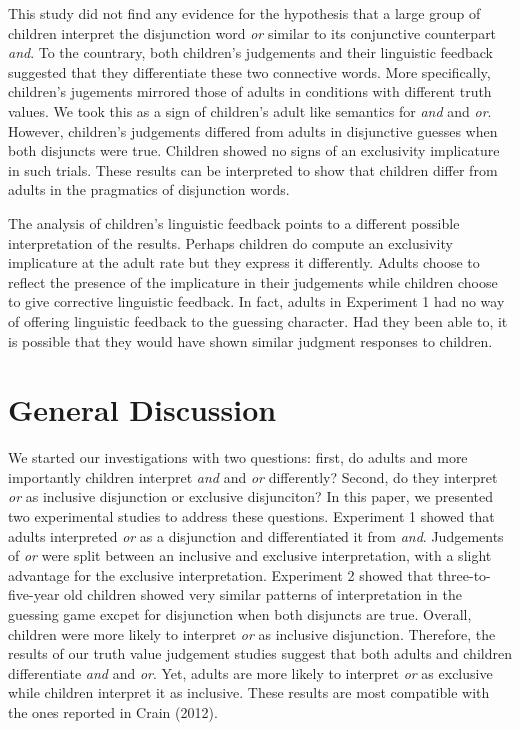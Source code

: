\documentclass[10pt, letterpaper]{article}
\begin{document}
This study did not find any evidence for the hypothesis that a large
group of children interpret the disjunction word \emph{or} similar to
its conjunctive counterpart \emph{and}. To the countrary, both
children's judgements and their linguistic feedback suggested that they
differentiate these two connective words. More specifically, children's
jugements mirrored those of adults in conditions with different truth
values. We took this as a sign of children's adult like semantics for
\emph{and} and \emph{or}. However, children's judgements differed from
adults in disjunctive guesses when both disjuncts were true. Children
showed no signs of an exclusivity implicature in such trials. These
results can be interpreted to show that children differ from adults in
the pragmatics of disjunction words.

The analysis of children's linguistic feedback points to a different
possible interpretation of the results. Perhaps children do compute an
exclusivity implicature at the adult rate but they express it
differently. Adults choose to reflect the presence of the implicature in
their judgements while children choose to give corrective linguistic
feedback. In fact, adults in Experiment 1 had no way of offering
linguistic feedback to the guessing character. Had they been able to, it
is possible that they would have shown similar judgment responses to
children.

\section{General Discussion}\label{general-discussion}

We started our investigations with two questions: first, do adults and
more importantly children interpret \emph{and} and \emph{or}
differently? Second, do they interpret \emph{or} as inclusive
disjunction or exclusive disjunciton? In this paper, we presented two
experimental studies to address these questions. Experiment 1 showed
that adults interpreted \emph{or} as a disjunction and differentiated it
from \emph{and}. Judgements of \emph{or} were split between an inclusive
and exclusive interpretation, with a slight advantage for the exclusive
interpretation. Experiment 2 showed that three-to-five-year old children
showed very similar patterns of interpretation in the guessing game
excpet for disjunction when both disjuncts are true. Overall, children
were more likely to interpret \emph{or} as inclusive disjunction.
Therefore, the results of our truth value judgement studies suggest that
both adults and children differentiate \emph{and} and \emph{or}. Yet,
adults are more likely to interpret \emph{or} as exclusive while
children interpret it as inclusive. These results are most compatible
with the ones reported in Crain (2012).
\end{document}
